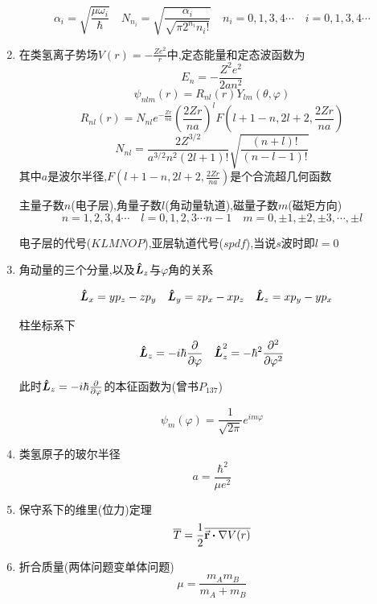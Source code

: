 \documentclass{article}
\begin{document}
\begin{formal}
\begin{enumerate}
                    $$ \alpha_{i} = \sqrt{\frac{\mu \omega_{i}}{\hbar}} \quad N_{n_{i}} = \sqrt{\frac{\alpha_{i}}{\sqrt{\pi 2^{n_{i}}n_{i}!}}}  \quad n_{i} = 0,1,3,4\cdots \quad i=0,1,3,4\cdots $$

                    \item 在类氢离子势场$V(r) = -\frac{Ze^{2}}{r}$中,定态能量和定态波函数为
                    $$ E_{n} = - \frac{Z^{2} e^{2}}{2a n^{2}} $$
                    $$ \psi_{nlm}(r) = R_{nl}(r) Y_{lm}(\theta,\varphi) $$
                    $$ R_{nl}(r) = N_{nl} e^{-\frac{Zr}{na}} (\frac{2Zr}{na})^{l} F(l+1-n,2l+2,\frac{2Zr}{na}) $$
                    $$ N_{nl} = \frac{2Z^{3/2}}{a^{3/2}n^{2}(2l+1)!} \sqrt{\frac{(n+l)!}{(n-l-1)!}}  $$
                    其中$a$是波尔半径,$F(l+1-n,2l+2,\frac{2Zr}{na})$是个合流超几何函数

                    主量子数$n$(电子层),角量子数$l$(角动量轨道),磁量子数$m$(磁矩方向)
                    $$ n = 1,2,3,4\cdots \quad l = 0,1,2,3\cdots n-1 \quad m = 0,\pm1,\pm2,\pm3,\cdots,\pm l $$

                    电子层的代号($KLMNOP$),亚层轨道代号($spdf$),当说$s$波时即$l=0$

                    \item 角动量的三个分量,以及$\vu*{L}_{z}$与$\varphi$角的关系

                    $$ \vu*{L}_{x} = y p_{z} - z p_{y} \quad \vu*{L}_{y} = z p_{x} - x p_{z} \quad \vu*{L}_{z} = x p_{y} - y p_{x} \quad $$
    
                    柱坐标系下
                    $$ \vu*{L}_{z} = -i\hbar \pdv{\varphi} \quad \vu*{L}_{z}^{2} = -\hbar^{2} \pdv[2]{\varphi} $$
    
                    此时$\vu*{L}_{z} = -i\hbar \pdv{\varphi}$的本征函数为(曾书$P_{137}$)
    
                    $$ \psi_{m}(\varphi) = \frac{1}{\sqrt{2\pi}} e^{im\varphi} $$

                    \item 类氢原子的玻尔半径
                    $$ a = \dfrac{\hbar^{2}}{\mu e^{2}} $$

                    \item 保守系下的维里(位力)定理
                    $$ \overline{T} = \frac{1}{2} \overline{\va{r} \vdot \nabla V(r)} $$

                    \item 折合质量(两体问题变单体问题)
                    $$ \mu = \dfrac{m_{A}m_{B}}{m_{A}+m_{B}} $$


                \end{enumerate}
            \end{formal}
\end{document}
